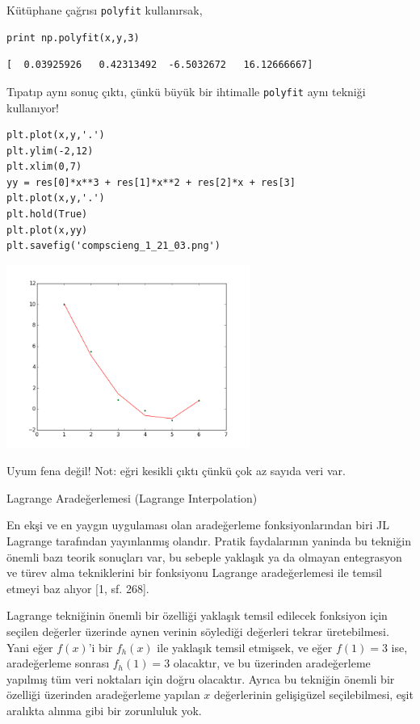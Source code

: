\documentclass[12pt,fleqn]{article}\usepackage{../../common}
\begin{document}
Kütüphane çağrısı \verb!polyfit! kullanırsak,

\begin{verbatim}
print np.polyfit(x,y,3)
\end{verbatim}

\begin{verbatim}
[  0.03925926   0.42313492  -6.5032672   16.12666667]
\end{verbatim}

Tıpatıp aynı sonuç çıktı, çünkü büyük bir ihtimalle \verb!polyfit! aynı
tekniği kullanıyor! 

\begin{verbatim}
plt.plot(x,y,'.')
plt.ylim(-2,12)
plt.xlim(0,7)
yy = res[0]*x**3 + res[1]*x**2 + res[2]*x + res[3]
plt.plot(x,y,'.')
plt.hold(True)
plt.plot(x,yy)
plt.savefig('compscieng_1_21_03.png')
\end{verbatim}

\includegraphics[height=6cm]{compscieng_1_21_03.png}

Uyum fena değil! Not: eğri kesikli çıktı çünkü çok az sayıda veri var. 


Lagrange Aradeğerlemesi (Lagrange Interpolation)

En ekşi ve en yaygın uygulaması olan aradeğerleme fonksiyonlarından biri JL
Lagrange tarafından yayınlanmış olandır. Pratik faydalarının yaninda bu tekniğin
önemli bazı teorik sonuçları var, bu sebeple yaklaşık ya da olmayan entegrasyon
ve türev alma tekniklerini bir fonksiyonu Lagrange aradeğerlemesi ile temsil
etmeyi baz alıyor [1, sf. 268].

Lagrange tekniğinin önemli bir özelliği yaklaşık temsil edilecek fonksiyon için
seçilen değerler üzerinde aynen verinin söylediği değerleri tekrar
üretebilmesi. Yani eğer $f(x)$'i bir $f_h(x)$ ile yaklaşık temsil etmişsek, ve
eğer $f(1) = 3$ ise, aradeğerleme sonrası $f_h(1) = 3$ olacaktır, ve bu
üzerinden aradeğerleme yapılmış tüm veri noktaları için doğru olacaktır.
Ayrıca bu tekniğin önemli bir özelliği üzerinden aradeğerleme yapılan $x$
değerlerinin gelişigüzel seçilebilmesi, eşit aralıkta alınma gibi bir
zorunluluk yok.
\end{document}
